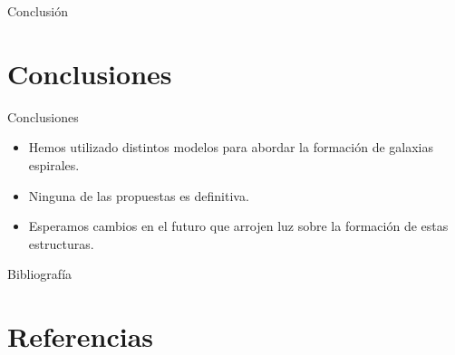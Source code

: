 \documentclass{beamer}
\begin{document}
\begin{frame}{Conclusión}
\section{Conclusiones}
\begin{block}{Conclusiones}
\begin{itemize}

    \item Hemos utilizado distintos modelos para abordar la formación de galaxias espirales.
    \item Ninguna de las propuestas es definitiva.
    \item Esperamos cambios en el futuro que arrojen luz sobre la formación de estas estructuras.
\end{itemize}
\end{block}
\end{frame}

\begin{frame}{Bibliografía}
\section{Referencias}

\printbibliography

\end{frame}
\end{document}
